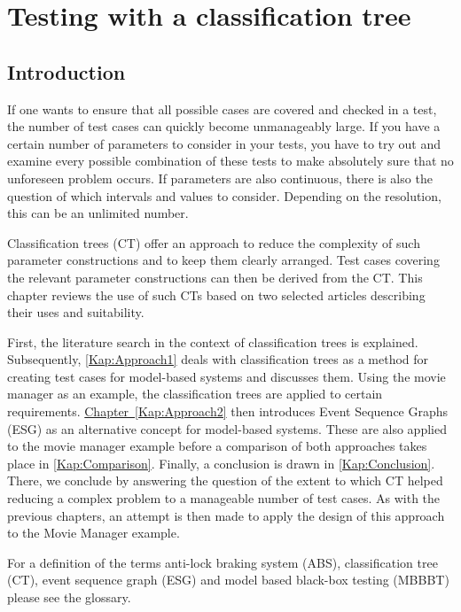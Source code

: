 \chapter{Testing with a classification tree}\label{sec:topic_5}

\section{Introduction}

If one wants to ensure that all possible cases are covered and checked in a test, the number of test cases can quickly become unmanageably large. If you have a certain number of parameters to consider in your tests, you have to try out and examine every possible combination of these tests to make absolutely sure that no unforeseen problem occurs. If parameters are also continuous, there is also the question of which intervals and values to consider. Depending on the resolution, this can be an unlimited number.

Classification trees (CT) offer an approach to reduce the complexity of such parameter constructions and to keep them clearly arranged. Test cases covering the relevant parameter constructions can then be derived from the CT. This chapter reviews the use of such CTs based on two selected articles describing their uses and suitability.

First, the literature search in the context of classification trees is explained. Subsequently, \autoref{Kap:Approach1} deals with classification trees as a method for creating test cases for model-based systems and discusses them. Using the movie manager as an example, the classification trees are applied to certain requirements. \hyperref[Chapter]{Chapter~\ref{Kap:Approach2}} then introduces Event Sequence Graphs (ESG) as an alternative concept for model-based systems. These are also applied to the movie manager example before a comparison of both approaches takes place in \autoref{Kap:Comparison}. Finally, a conclusion is drawn in \autoref{Kap:Conclusion}. There, we conclude by answering the question of the extent to which CT helped reducing a complex problem to a manageable number of test cases. As with the previous chapters, an attempt is then made to apply the design of this approach to the Movie Manager example.

For a definition of the terms anti-lock braking system (ABS), classification tree (CT), event sequence graph (ESG) and model based black-box testing (MBBBT) please see the glossary. 

